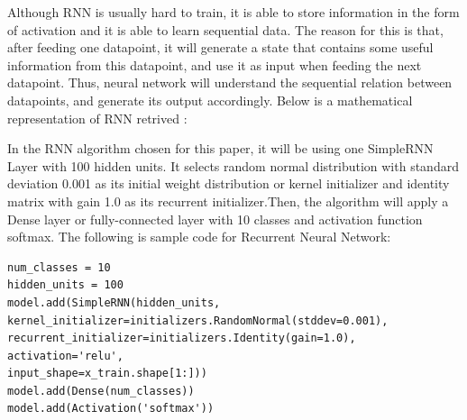 \documentclass[letterpaper]{article} %
\begin{document}
Although RNN is usually hard to train, it is able to store information in the form of activation and it is able to learn sequential data. The reason for this is that, after feeding one datapoint, it will generate a state that contains some useful information from this datapoint, and use it as input when feeding the next datapoint. Thus, neural network will understand the sequential relation between datapoints, and generate its output accordingly. Below is a mathematical representation of RNN retrived :
In the RNN algorithm chosen for this paper, it will be using one SimpleRNN Layer with 100 hidden units. It selects random normal distribution with standard deviation 0.001 as its initial weight distribution or kernel initializer and identity matrix with gain 1.0 as its recurrent initializer.Then, the algorithm will apply a Dense layer or fully-connected layer with 10 classes and activation function softmax. The following is sample code for Recurrent Neural Network:

\begin{lstlisting}[columns=fullflexible, keepspaces=true, stepnumber=1]
num_classes = 10
hidden_units = 100
model.add(SimpleRNN(hidden_units,
kernel_initializer=initializers.RandomNormal(stddev=0.001),
recurrent_initializer=initializers.Identity(gain=1.0),
activation='relu',
input_shape=x_train.shape[1:]))
model.add(Dense(num_classes))
model.add(Activation('softmax'))
\end{lstlisting}
\end{document}
